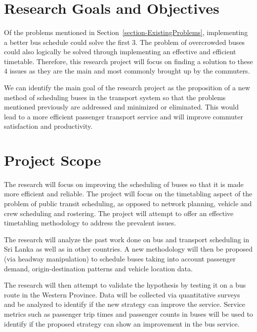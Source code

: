\documentclass[12pt, oneside]{report}
\begin{document}
\newpage

\section{Research Goals and Objectives}
\label{section-ResearchGoalsAndObjectives}

\paragraph{ } Of the problems mentioned in Section~\ref{section-ExistingProblems}, implementing a better bus schedule could solve the first 3. The problem of overcrowded buses could also logically be solved through implementing an effective and efficient timetable. Therefore, this research project will focus on finding a solution to these 4 issues as they are the main and most commonly brought up by the commuters.

We can identify the main goal of the research project as the proposition of a new method of scheduling buses in the transport system so that the problems mentioned previously are addressed and minimized or eliminated. This would lead to a more efficient passenger transport service and will improve commuter satisfaction and productivity.

\section{Project Scope}
\label{section-ProjectScope}

\paragraph{ } The research will focus on improving the scheduling of buses so that it is made more efficient and reliable. The project will focus on the timetabling aspect of the problem of public transit scheduling, as opposed to network planning, vehicle and crew scheduling and rostering. The project will attempt to offer an effective timetabling methodology to address the prevalent issues.

The research will analyze the past work done on bus and transport scheduling in Sri Lanka as well as in other countries. A new methodology will then be proposed (via headway manipulation) to schedule buses taking into account passenger demand, origin-destination patterns and vehicle location data.

The research will then attempt to validate the hypothesis by testing it on a bus route in the Western Province. Data will be collected via quantitative surveys and be analyzed to identify if the new strategy can improve the service. Service metrics such as passenger trip times and passenger counts in buses will be used to identify if the proposed strategy can show an improvement in the bus service.
\end{document}

